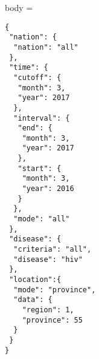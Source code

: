 \begin{multicols}{2}
body = 
\begin{verbatim}
{
 "nation": {
  "nation": "all"
 },
 "time": {
  "cutoff": {
   "month": 3,
   "year": 2017
  },
  "interval": {
   "end": {
    "month": 3,
    "year": 2017
   },
   "start": {
    "month": 3,
    "year": 2016
   }
  },
  "mode": "all"
 },
 "disease": {
  "criteria": "all",
  "disease": "hiv"
 },
 "location":{
  "mode": "province",
  "data": {
  	"region": 1,
  	"province": 55
  }
 }
}
\end{verbatim}
\end{multicols}